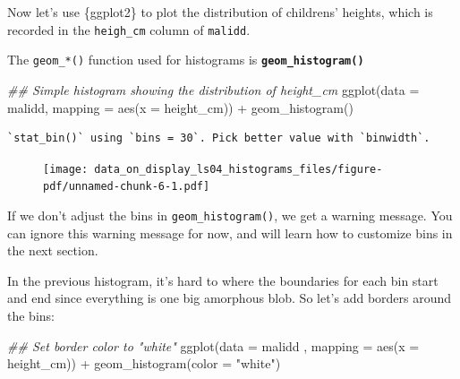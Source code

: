 \documentclass[
  letterpaper,
  DIV=11,
  numbers=noendperiod]{scrreprt}
\newenvironment{Shaded}{\begin{snugshade}}{\end{snugshade}}
\newcommand{\AttributeTok}[1]{\textcolor[rgb]{0.40,0.45,0.13}{#1}}
\newcommand{\DocumentationTok}[1]{\textcolor[rgb]{0.37,0.37,0.37}{\textit{#1}}}
\newcommand{\FunctionTok}[1]{\textcolor[rgb]{0.28,0.35,0.67}{#1}}
\newcommand{\NormalTok}[1]{\textcolor[rgb]{0.00,0.23,0.31}{#1}}
\newcommand{\SpecialCharTok}[1]{\textcolor[rgb]{0.37,0.37,0.37}{#1}}
\newcommand{\StringTok}[1]{\textcolor[rgb]{0.13,0.47,0.30}{#1}}
\begin{document}
Now let's use \{ggplot2\} to plot the distribution of childrens'
heights, which is recorded in the \texttt{heigh\_cm} column of
\texttt{malidd}.

The \texttt{geom\_*()} function used for histograms is
\textbf{\texttt{geom\_histogram()}}

\begin{Shaded}
\begin{Highlighting}[]
\DocumentationTok{\#\# Simple histogram showing the distribution of height\_cm}
\FunctionTok{ggplot}\NormalTok{(}\AttributeTok{data =}\NormalTok{ malidd, }
       \AttributeTok{mapping =} \FunctionTok{aes}\NormalTok{(}\AttributeTok{x =}\NormalTok{ height\_cm)) }\SpecialCharTok{+}
  \FunctionTok{geom\_histogram}\NormalTok{()}
\end{Highlighting}
\end{Shaded}

\begin{verbatim}
`stat_bin()` using `bins = 30`. Pick better value with `binwidth`.
\end{verbatim}

\begin{figure}[H]

{\centering \texttt{[image: data\_on\_display\_ls04\_histograms\_files/figure-pdf/unnamed-chunk-6-1.pdf]}

}

\end{figure}

\begin{tcolorbox}[enhanced jigsaw, colframe=quarto-callout-note-color-frame, rightrule=.15mm, opacityback=0, breakable, coltitle=black, colbacktitle=quarto-callout-note-color!10!white, bottomrule=.15mm, leftrule=.75mm, toprule=.15mm, arc=.35mm, bottomtitle=1mm, colback=white, left=2mm, opacitybacktitle=0.6, titlerule=0mm, title=\textcolor{quarto-callout-note-color}{\faInfo}\hspace{0.5em}{Side Note}, toptitle=1mm]

If we don't adjust the bins in \texttt{geom\_histogram()}, we get a
warning message. You can ignore this warning message for now, and will
learn how to customize bins in the next section.

\end{tcolorbox}

In the previous histogram, it's hard to where the boundaries for each
bin start and end since everything is one big amorphous blob. So let's
add borders around the bins:

\begin{Shaded}
\begin{Highlighting}[]
\DocumentationTok{\#\# Set border color to "white"}
\FunctionTok{ggplot}\NormalTok{(}\AttributeTok{data =}\NormalTok{  malidd , }
       \AttributeTok{mapping =} \FunctionTok{aes}\NormalTok{(}\AttributeTok{x =}\NormalTok{ height\_cm)) }\SpecialCharTok{+}
  \FunctionTok{geom\_histogram}\NormalTok{(}\AttributeTok{color =} \StringTok{"white"}\NormalTok{)}
\end{Highlighting}
\end{Shaded}
\end{document}
